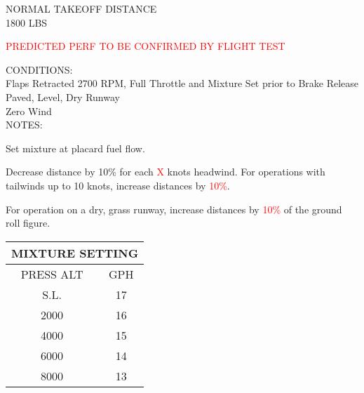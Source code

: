 \begin{sidewaysfigure}[t]
\begin{center}
\begin{perfhdr}NORMAL TAKEOFF DISTANCE\\
1800 LBS
\end{perfhdr}
\Large
\textcolor{red}{PREDICTED PERF TO BE CONFIRMED BY FLIGHT TEST}\normalsize \vspace{5ex}\\

\begin{minipage}{7.5in}
  \begin{flushleft}
    CONDITIONS:\\
    Flaps Retracted
    2700 RPM, Full Throttle and Mixture Set prior to Brake Release\\
    Paved, Level, Dry Runway\\
    Zero Wind\\
\vspace{\perfnoteskip}
    NOTES:
    \begin{enumerate*}
      \item Set mixture at placard fuel flow.
      \item Decrease distance by 10\% for each \textcolor{red}{X} knots headwind.  For operations with tailwinds up to 10
      knots, increase distances by \textcolor{red}{10\%}.
      \item For operation on a dry, grass runway, increase distances by \textcolor{red}{10\%} of the ground roll figure.
      \end{enumerate*}
    \end{flushleft}
  \end{minipage}
\hfill
\begin{minipage}{1.5in}
  \begin{tabular}{|c|c|}
    \hline
    \multicolumn{2}{|c|}{MIXTURE SETTING}\\
    \hline
    PRESS ALT&GPH\\
    \hline
    S.L.&17\\
    2000&16\\
    4000&15\\
    6000&14\\
    8000&13\\
    \hline
    \end{tabular}
  \end{minipage}
\\


\end{center}
\end{sidewaysfigure}
